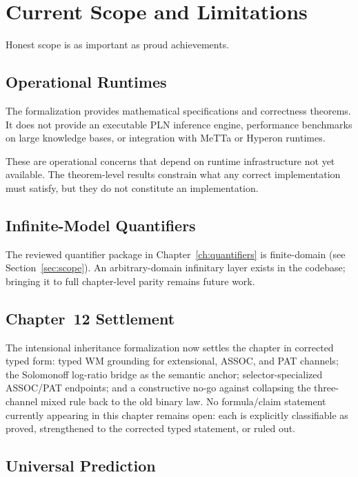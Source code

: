 \documentclass[11pt,openany]{report}
\begin{document}
\chapter{Current Scope and Limitations}
\label{ch:what-not-proved}

Honest scope is as important as proud achievements.

\section{Operational Runtimes}

The formalization provides mathematical specifications and correctness
theorems.  It does not provide an executable PLN inference engine,
performance benchmarks on large knowledge bases, or integration with
MeTTa or Hyperon runtimes.

These are operational concerns that depend on runtime infrastructure
not yet available.  The theorem-level results constrain what any correct
implementation must satisfy, but they do not constitute an implementation.

\section{Infinite-Model Quantifiers}

The reviewed quantifier package in Chapter~\ref{ch:quantifiers} is
finite-domain (see Section~\ref{sec:scope}).  An arbitrary-domain
infinitary layer exists in the codebase; bringing it to full
chapter-level parity remains future work.

\section{Chapter~12 Settlement}

The intensional inheritance formalization now settles the chapter in
corrected typed form: typed WM grounding for extensional, ASSOC, and
PAT channels; the Solomonoff log-ratio bridge as the semantic anchor;
selector-specialized ASSOC/PAT endpoints; and a constructive no-go
against collapsing the three-channel mixed rule back to the old binary
law.  No formula/claim statement currently appearing in this chapter
remains open: each is explicitly classifiable as proved, strengthened to
the corrected typed statement, or ruled out.

\section{Universal Prediction}
\end{document}
